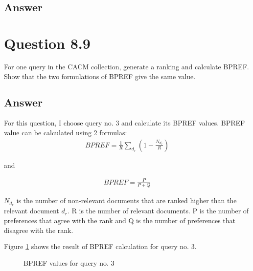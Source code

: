 \documentclass[letterpaper,11pt]{article}
\begin{document}
\subsection*{Answer}

\noindent\makebox[\linewidth]{\rule{\textwidth}{0.4pt}}

\section*{Question 8.9}
\begin{spverbatim}
For one query in the CACM collection, generate a ranking and calculate
BPREF. Show that the two formulations of BPREF give the same value.
\end{spverbatim}

\subsection*{Answer}
For this question, I choose query no. 3 and calculate its BPREF values. BPREF value can be calculated using 2 formulas:
\begin{align}
BPREF = \frac{1}{R} \sum_{d_r}(1 - \frac{N_{d_r}}{R})
\end{align}

and 

\begin{align}
BPREF = \frac{P}{P + Q}
\end{align}

\(N_{d_r}\) is the number of non-relevant documents that are ranked higher than the relevant document \({d_r}\). R is the number of relevant documents. P is the number of preferences that agree with the rank and Q is the number of preferences that disagree with the rank. 

Figure \ref{fig:89_output} shows the result of BPREF calculation for query no. 3. 
\begin{figure}[H]
	\centering
	\caption{BPREF values for query no. 3}
	\label{fig:89_output}
\end{figure}
\end{document}
